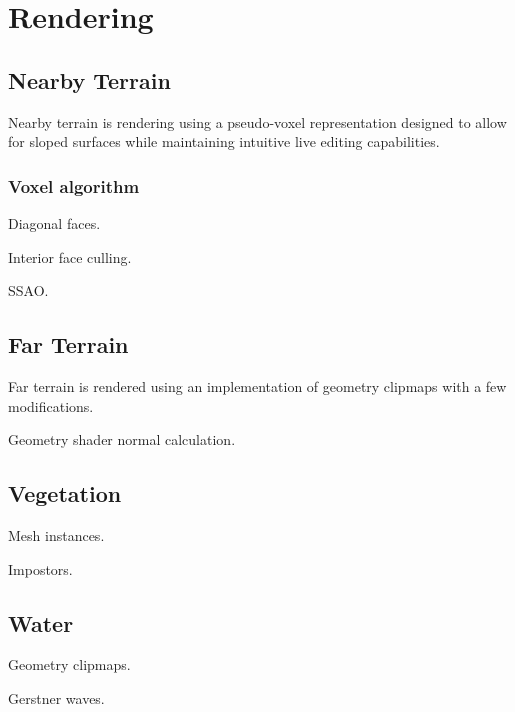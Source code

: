 
\chapter{Rendering}

\section{Nearby Terrain}

Nearby terrain is rendering using a pseudo-voxel representation designed to allow for sloped surfaces while maintaining intuitive live editing capabilities.

\subsection{Voxel algorithm}

Diagonal faces.

Interior face culling.

SSAO.

\section{Far Terrain}

Far terrain is rendered using an implementation of geometry clipmaps with a few modifications.

Geometry shader normal calculation.


\section{Vegetation}

Mesh instances.

Impostors.

\section{Water}

Geometry clipmaps.

Gerstner waves.
